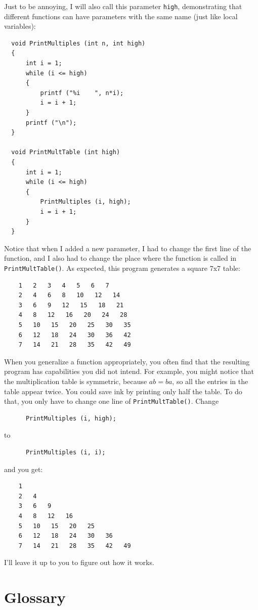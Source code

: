 Just to be annoying, I will also call this parameter {\tt high},
demonstrating that different functions can have parameters
with the same name (just like local variables):

\begin{verbatim}
  void PrintMultiples (int n, int high) 
  {
      int i = 1;
      while (i <= high) 
      {
          printf ("%i    ", n*i);
          i = i + 1;
      }    
      printf ("\n");
  }

  void PrintMultTable (int high) 
  {
      int i = 1;
      while (i <= high) 
      {
          PrintMultiples (i, high);
          i = i + 1;
      }
  }
\end{verbatim}
%
Notice that when I added a new parameter, I had to change the first
line of the function, and I also had to
change the place where the function is called in {\tt PrintMultTable()}.
As expected, this program generates a square 7x7 table:

\begin{verbatim}
    1   2   3   4   5   6   7   
    2   4   6   8   10   12   14   
    3   6   9   12   15   18   21   
    4   8   12   16   20   24   28   
    5   10   15   20   25   30   35   
    6   12   18   24   30   36   42   
    7   14   21   28   35   42   49
\end{verbatim}
%
When you generalize a function appropriately, you often find
that the resulting program has capabilities you did not intend.
For example, you might notice that the multiplication table
is symmetric, because $ab = ba$, so all the entries in the
table appear twice.  You could save ink by printing only
half the table.  To do that, you only have to change one
line of {\tt PrintMultTable()}.  Change

\begin{verbatim}
      PrintMultiples (i, high);
\end{verbatim}
%
to

\begin{verbatim}
      PrintMultiples (i, i);
\end{verbatim}
%
and you get:

\begin{verbatim}
    1   
    2   4   
    3   6   9   
    4   8   12   16   
    5   10   15   20   25   
    6   12   18   24   30   36   
    7   14   21   28   35   42   49  
\end{verbatim}
%
I'll leave it up to you to figure out how it works.

\section{Glossary}

